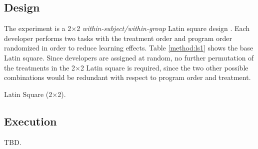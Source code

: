 \subsection{Design}
The experiment is a 2$\times$2 \textit{within-subject/within-group}  Latin square design \cite{box}. Each developer performs two tasks with the treatment order and program order randomized in order to reduce learning effects. Table \ref{method:ls1} shows the base Latin square.
Since developers are assigned at random, no further permutation of the treatments in the 2$\times$2 Latin square is required, since the two other possible combinations would be redundant with respect to program order and treatment.

\begin{table}[h]
\centering
\caption{Latin Square (2$\times$2).}
\label{method:ls1}
\end{table}

\subsection{Execution}
TBD.
